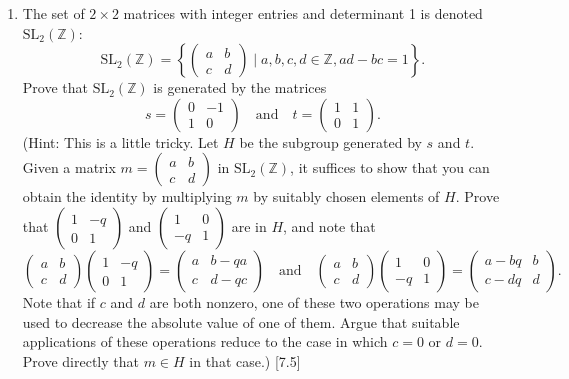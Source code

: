 \begin{enumerate}
    \item The set of $2 \times 2$ matrices with integer entries and determinant 1 is denoted $\text{SL}_2(\mathbb{Z})$:
          \[ \text{SL}_2(\mathbb{Z}) = \left\{ \begin{pmatrix} a & b \\ c & d \end{pmatrix} \mid a, b, c, d \in \mathbb{Z}, ad-bc=1 \right\}. \]
          Prove that $\text{SL}_2(\mathbb{Z})$ is generated by the matrices
          \[ s = \begin{pmatrix} 0 & -1 \\ 1 & 0 \end{pmatrix} \quad \text{and} \quad t = \begin{pmatrix} 1 & 1 \\ 0 & 1 \end{pmatrix}. \]
          (Hint: This is a little tricky. Let $H$ be the subgroup generated by $s$ and $t$. Given a matrix $m = \begin{pmatrix} a & b \\ c & d \end{pmatrix}$ in $\text{SL}_2(\mathbb{Z})$, it suffices to show that you can obtain the identity by multiplying $m$ by suitably chosen elements of $H$. Prove that $\begin{pmatrix} 1 & -q \\ 0 & 1 \end{pmatrix}$ and $\begin{pmatrix} 1 & 0 \\ -q & 1 \end{pmatrix}$ are in $H$, and note that
          \[ \begin{pmatrix} a & b \\ c & d \end{pmatrix} \begin{pmatrix} 1 & -q \\ 0 & 1 \end{pmatrix} = \begin{pmatrix} a & b-qa \\ c & d-qc \end{pmatrix} \quad \text{and} \quad \begin{pmatrix} a & b \\ c & d \end{pmatrix} \begin{pmatrix} 1 & 0 \\ -q & 1 \end{pmatrix} = \begin{pmatrix} a-bq & b \\ c-dq & d \end{pmatrix}. \]
          Note that if $c$ and $d$ are both nonzero, one of these two operations may be used to decrease the absolute value of one of them. Argue that suitable applications of these operations reduce to the case in which $c=0$ or $d=0$. Prove directly that $m \in H$ in that case.) [7.5]


\end{enumerate}
